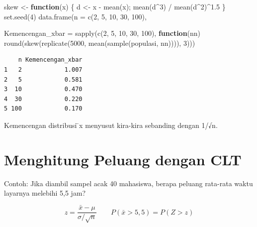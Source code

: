 \documentclass[
  indonesian,
  letterpaper,
]{book}
\newenvironment{Shaded}{\begin{snugshade}}{\end{snugshade}}
\newcommand{\AttributeTok}[1]{\textcolor[rgb]{0.40,0.45,0.13}{#1}}
\newcommand{\ControlFlowTok}[1]{\textcolor[rgb]{0.00,0.23,0.31}{\textbf{#1}}}
\newcommand{\DecValTok}[1]{\textcolor[rgb]{0.68,0.00,0.00}{#1}}
\newcommand{\FloatTok}[1]{\textcolor[rgb]{0.68,0.00,0.00}{#1}}
\newcommand{\FunctionTok}[1]{\textcolor[rgb]{0.28,0.35,0.67}{#1}}
\newcommand{\NormalTok}[1]{\textcolor[rgb]{0.00,0.23,0.31}{#1}}
\newcommand{\OtherTok}[1]{\textcolor[rgb]{0.00,0.23,0.31}{#1}}
\newcommand{\SpecialCharTok}[1]{\textcolor[rgb]{0.37,0.37,0.37}{#1}}
\begin{document}
\begin{Shaded}
\begin{Highlighting}[]
\NormalTok{skew }\OtherTok{\textless{}{-}} \ControlFlowTok{function}\NormalTok{(x) \{ d }\OtherTok{\textless{}{-}}\NormalTok{ x }\SpecialCharTok{{-}} \FunctionTok{mean}\NormalTok{(x); }\FunctionTok{mean}\NormalTok{(d}\SpecialCharTok{\^{}}\DecValTok{3}\NormalTok{) }\SpecialCharTok{/} \FunctionTok{mean}\NormalTok{(d}\SpecialCharTok{\^{}}\DecValTok{2}\NormalTok{)}\SpecialCharTok{\^{}}\FloatTok{1.5}\NormalTok{ \}}
\FunctionTok{set.seed}\NormalTok{(}\DecValTok{4}\NormalTok{)}
\FunctionTok{data.frame}\NormalTok{(}\AttributeTok{n =} \FunctionTok{c}\NormalTok{(}\DecValTok{2}\NormalTok{, }\DecValTok{5}\NormalTok{, }\DecValTok{10}\NormalTok{, }\DecValTok{30}\NormalTok{, }\DecValTok{100}\NormalTok{),}

\AttributeTok{Kemencengan\_xbar =} \FunctionTok{sapply}\NormalTok{(}\FunctionTok{c}\NormalTok{(}\DecValTok{2}\NormalTok{, }\DecValTok{5}\NormalTok{, }\DecValTok{10}\NormalTok{, }\DecValTok{30}\NormalTok{, }\DecValTok{100}\NormalTok{), }\ControlFlowTok{function}\NormalTok{(nn)}
\FunctionTok{round}\NormalTok{(}\FunctionTok{skew}\NormalTok{(}\FunctionTok{replicate}\NormalTok{(}\DecValTok{5000}\NormalTok{, }\FunctionTok{mean}\NormalTok{(}\FunctionTok{sample}\NormalTok{(populasi, nn)))), }\DecValTok{3}\NormalTok{)))}
\end{Highlighting}
\end{Shaded}

\begin{verbatim}
    n Kemencengan_xbar
1   2            1.007
2   5            0.581
3  10            0.470
4  30            0.220
5 100            0.170
\end{verbatim}

Kemencengan distribusi ̄x menyusut kira-kira sebanding dengan 1/√n.

\section{Menghitung Peluang dengan
CLT}\label{menghitung-peluang-dengan-clt}

Contoh: Jika diambil sampel acak 40 mahasiswa, berapa peluang rata-rata
waktu layarnya melebihi 5,5 jam?

\[z = \frac{\bar{x} - \mu}{\sigma/\sqrt{n}} \qquad P(\bar{x} > 5,5) = P(Z > z)\]
\end{document}
